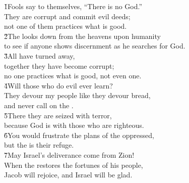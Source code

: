 \begin{poetry}
\poeml \v{1}Fools say to themselves, ``There is no God.'' \\
\poemll    They are corrupt and commit evil deeds; \\
\poemlll       not one of them practices what is good. \\
\poeml \v{2}The  looks down from the heavens upon humanity \\
\poemll    to see if anyone shows discernment as he searches for God. \\
\poeml \v{3}All have turned away, \\
\poemll    together they have become corrupt; \\
\poemlll       no one practices what is good, not even one. \\
\poeml \v{4}Will those who do evil ever learn? \\
\poemll    They devour my people like they devour bread, \\
\poemlll       and never call on the . \\
\poeml \v{5}There they are seized with terror, \\
\poemll    because God is with those who are righteous. \\
\poeml \v{6}You would frustrate the plans of the oppressed, \\
\poemll    but the  is their refuge. \\
\poeml \v{7}May Israel's deliverance come from Zion! \\
\poemll    When the  restores the fortunes of his people, \\
\poemlll       Jacob will rejoice, and Israel will be glad.
\end{poetry}

